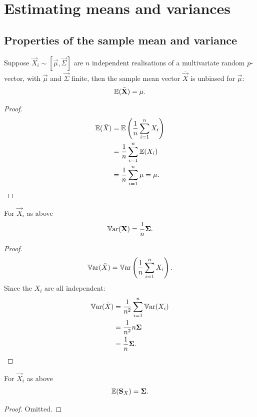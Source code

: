 \documentclass[10pt, a4paper]{article}
\begin{document}
\newpage

\section{Estimating means and variances}

\subsection{Properties of the sample mean and variance}

\begin{proposition}
    Suppose $\vec{X}_i \sim [\vec{\mu}, \vec{\Sigma}]$ are $n$ independent realisations of a multivariate random $p$-vector,
    with $\vec{\mu}$ and $\vec{\Sigma}$ finite,
    then the sample mean vector $\bar{\vec{X}}$ is unbiased for $\vec{\mu}$:
    \[
    \mathbb{E}(\bar{\mathbf{X}}) = \mathbf{\mu}.
    \]

    \begin{proof}
        \begin{align*}
            \mathbb{E}(\bar{X}) &= \mathbb{E}\left(\frac{1}{n}\sum_{i = 1}^{n}X_i\right) \\
            &= \frac{1}{n}\sum_{i = 1}^{n}\mathbb{E}(X_i) \\
            &= \frac{1}{n}\sum_{i = 1}^{n}\mu = \mu.
        \end{align*}
    \end{proof}
\end{proposition}

\begin{proposition}
    For $\vec{X}_i$ as above
    \[
    \mathbb{V}\mathrm{ar}(\bar{\mathbf{X}}) = \frac{1}{n}\mathbf{\Sigma}.
    \]

    \begin{proof}
        \[
        \mathbb{V}\mathrm{ar}(\bar{X}) = \mathbb{V}\mathrm{ar}\left(\frac{1}{n}\sum_{i = 1}^{n}X_i\right).
        \]
        Since the $X_i$ are all independent:
        \begin{align*}
            \mathbb{V}\mathrm{ar}(\bar{X}) &= \frac{1}{n ^ 2}\sum_{i = 1}^{n}\mathbb{V}\mathrm{ar}(X_i) \\
            &= \frac{1}{n ^ 2}n\mathbf{\Sigma} \\
            &= \frac{1}{n}\mathbf{\Sigma}.
        \end{align*}
    \end{proof}
\end{proposition}

\begin{proposition}
    For $\vec{X}_i$ as above
    \[
    \mathbb{E}(\mathbf{S}_X) = \mathbf{\Sigma}.
    \]
    
    \begin{proof}
        Omitted.
    \end{proof}
\end{proposition}
\end{document}

